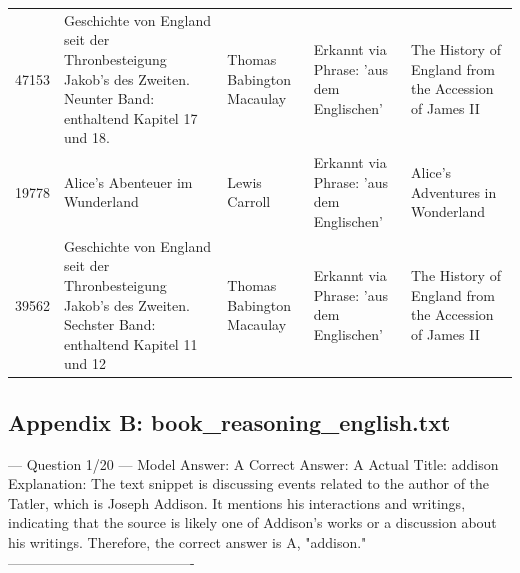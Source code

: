 \documentclass[11pt]{article}
\begin{document}
\begin{landscape}
\begin{longtable}{ p{2cm} p{6cm} p{3.8cm} p{5.2cm} p{5.5cm} }
    47153 & Geschichte von England seit der Thronbesteigung Jakob's des Zweiten. Neunter Band: enthaltend Kapitel 17 und 18. & Thomas Babington Macaulay & Erkannt via Phrase: 'aus dem Englischen' & The History of England from the Accession of James II \\
    19778 & Alice's Abenteuer im Wunderland & Lewis Carroll & Erkannt via Phrase: 'aus dem Englischen' & Alice's Adventures in Wonderland \\
    39562 & Geschichte von England seit der Thronbesteigung Jakob's des Zweiten. Sechster Band: enthaltend Kapitel 11 und 12 & Thomas Babington Macaulay & Erkannt via Phrase: 'aus dem Englischen' & The History of England from the Accession of James II \\

  \end{longtable}
  \endgroup
\end{landscape}

\newpage
\subsection{Appendix B: book\_reasoning\_english.txt}
--- Question 1/20 ---
Model Answer:    A
Correct Answer:  A
Actual Title:    addison
Explanation:     The text snippet is discussing events related to the author of the Tatler, which is Joseph Addison. It mentions his interactions and writings, indicating that the source is likely one of Addison's works or a discussion about his writings. Therefore, the correct answer is A, "addison."
----------------------------------------
\end{document}
